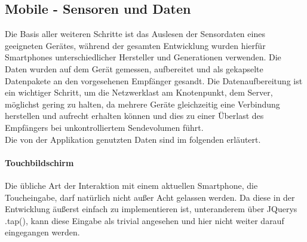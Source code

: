 \documentclass[a4paper]{spie}  %
\begin{document}
\subsection{Mobile - Sensoren und Daten}
Die Basis aller weiteren Schritte ist das Auslesen der Sensordaten eines geeigneten Gerätes, während der gesamten Entwicklung wurden hierfür Smartphones unterschiedlicher Hersteller und Generationen verwenden. Die Daten wurden auf dem Gerät gemessen, aufbereitet und als gekapselte Datenpakete an den vorgesehenen Empfänger gesandt. Die Datenaufbereitung ist ein wichtiger Schritt, um die Netzwerklast am Knotenpunkt, dem Server, möglichst gering zu halten, da mehrere Geräte gleichzeitig eine Verbindung herstellen und aufrecht erhalten können und dies zu einer Überlast des Empfängers bei unkontrolliertem Sendevolumen führt.\\
Die von der Applikation genutzten Daten sind im folgenden erläutert.
\paragraph{Touchbildschirm}
Die übliche Art der Interaktion mit einem aktuellen Smartphone, die Toucheingabe, darf natürlich nicht außer Acht gelassen werden. Da diese in der Entwicklung äußerst einfach zu implementieren ist, unteranderem über JQuerys .tap(), kann diese Eingabe als trivial angesehen und hier nicht weiter darauf eingegangen werden.
\end{document}
